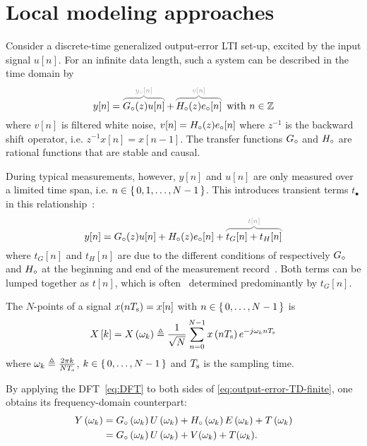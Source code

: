 \section{Local modeling approaches}
\label{sec:theory}

Consider a discrete-time generalized output-error \gls{LTI} set-up, excited by the input signal $u[n]$.
For an infinite data length, such a system can be described in the time domain by
\begin{equation}
  y[n] = \ezbrace{\true{G}(z) u[n]}{\true{y}[n]} + \ezbrace{\true{H}(z) \true{e}[n]}{v[n]} \text{ with } n \in \IntegerNumbers
  \label{eq:output-error-TD-infinite}
\end{equation}
where $v[n]$ is filtered white noise, $v[n] = {H}_{\circ}(z) {e}_{\circ}[n]$ where $z^{-1}$ is the backward shift operator, i.e. $z^ {-1}x[n] = x[n-1]$.
The transfer functions ${G}_{\circ}$ and ${H}_{\circ}$ are rational functions that are stable and causal.

During typical measurements, however, $y[n]$ and $u[n]$ are only measured over a limited time span, i.e. $n \in \set{0,1,\ldots,N-1}$.
This introduces transient terms $t_{\bullet}$ in this relationship~\citep{Pintelon1997ARB}:
\begin{equation}
y[n] = \true{G}(z) u[n] + \true{H}(z) \true{e}[n] + \ezbrace{t_G[n] + t_H[n]}{t[n]}
\label{eq:output-error-TD-finite}
\end{equation}
where $t_G[n]$ and $t_H[n]$ are due to the different conditions of respectively ${G}_{\circ}$ and ${H}_{\circ}$ at the beginning and end of the measurement record~\citep{Pintelon1997ARB}.
Both terms can be lumped together as $t[n]$, which is often~\citep{Pintelon2010LPM1} determined predominantly by $t_G[n]$.

\begin{definition}\label{def:DFT}
The $N$-points  of a signal $x(nT_{\mathrm{s}}) = x[n]$ with $n \in \set{0,\ldots,N-1}$ is
\begin{equation}
  X \left[ k \right] =
  X \left( \omega_k \right)
  \triangleq
  \frac{1}{\sqrt{N}}\sum_{n=0}^{N-1} x \left( n T_{\mathrm{s}} \right)  e^{- j \omega_k n T_{\mathrm{s}} }
  \label{eq:DFT}
\end{equation}
where $\omega_k \triangleq \tfrac{2 \pi k }{N T_{\mathrm{s}}}$, $k \in \set{0,\ldots,N-1}$ and $T_{\mathrm{s}}$ is the sampling time.
\end{definition}

By applying the \gls{DFT}~\eqref{eq:DFT} to both sides of \eqref{eq:output-error-TD-finite}, one obtains its frequency-domain counterpart:
\begin{align}
    Y \left( \omega_k \right) 
    & = {G}_{\circ} \left( \omega_k \right) U \left( \omega_k \right) 
      + {H}_{\circ} \left( \omega_k \right) E \left( \omega_k \right)
      + T \left( \omega_k \right)\\
      &= {G}_{\circ} \left( \omega_k \right) U \left( \omega_k \right)  + V(\omega_k) + T(\omega_k)
      \text{.}
  \label{eq:output-error-FD}
\end{align}

